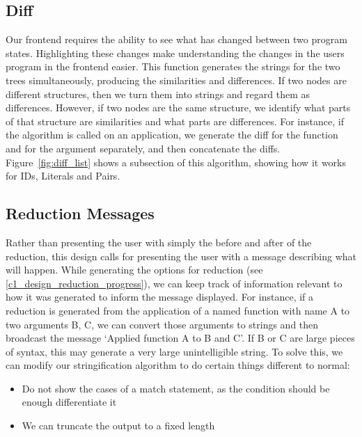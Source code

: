 \subsection{Diff}
\label{paragraph:diff} 
Our frontend requires the ability to see what has changed between two program states. Highlighting these changes make understanding the changes in the users program in the frontend easier. This function generates the strings for the two trees simultaneously, producing the similarities and differences. If two nodes are different structures, then we turn them into strings and regard them as differences. However, if two nodes are the same structure, we identify what parts of that structure are similarities and what parts are differences. For instance, if the algorithm is called on an application, we generate the diff for the function and for the argument separately, and then concatenate the diffs. Figure~\ref{fig:diff_list} shows a subsection of this algorithm, showing how it works for IDs, Literals and Pairs. 




\subsection{Reduction Messages}
Rather than presenting the user with simply the before and after of the reduction, this design calls for presenting the user with a message describing what will happen. While generating the options for reduction (see \ref{c1_design_reduction_progress}), we can keep track of information relevant to how it was generated to inform the message displayed. For instance, if a reduction is generated from the application of a named function with name A to two arguments B, C, we can convert those arguments to strings and then broadcast the message `Applied function A to B and C'. 
If B or C are large pieces of syntax, this may generate a very large unintelligible string. To solve this, we can modify our stringification algorithm to do certain things different to normal:
\begin{itemize}
    \item Do not show the cases of a match statement, as the condition should be enough differentiate it
    \item We can truncate the output to a fixed length 
\end{itemize}

